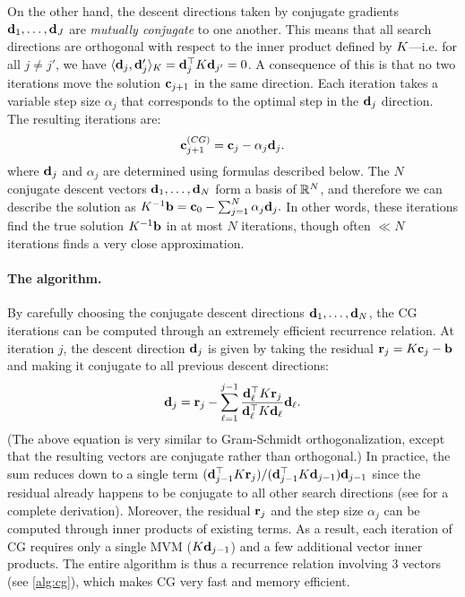 On the other hand, the descent directions taken by conjugate gradients $\mathbf{d}_1, \ldots, \mathbf{d}_J$ are \emph{mutually conjugate} to one another.
This means that all search directions are orthogonal with respect to the inner product defined by $K$---i.e. for all $j \ne j'$, we have $\langle \mathbf{d}_j, \mathbf{d}_j' \rangle_{K} = \mathbf{d}_j^\top K \mathbf{d}_{j'} = 0$.
A consequence of this is that no two iterations move the solution $\mathbf{c}_{j+1}$ in the same direction.
Each iteration takes a variable step size $\alpha_j$ that corresponds to the optimal step in the $\mathbf{d}_j$ direction.
The resulting iterations are:
%
\begin{equation*}
  \mathbf{c}_{j+1}^{\text(CG)} = \mathbf{c}_{j} - \alpha_j \mathbf{d}_{j}.
\end{equation*}
%
where $\mathbf{d}_j$ and $\alpha_j$ are determined using formulas described below.
The $N$ conjugate descent vectors $\mathbf{d}_1, \ldots, \mathbf{d}_N$ form a basis of $\mathbb{R}^N$, and therefore we can describe the solution as $K^{-1} \mathbf{b} = \mathbf{c}_0 - \sum_{j=1}^N \alpha_j \mathbf{d}_j.$
In other words, these iterations find the true solution $K^{-1} \mathbf{b}$ in at most $N$ iterations, though often $\ll N$ iterations finds a very close approximation.

\paragraph{The algorithm.}
By carefully choosing the conjugate descent directions $\mathbf{d}_1, \ldots, \mathbf{d}_N$, the CG iterations can be computed through an extremely efficient recurrence relation.
At iteration $j$, the descent direction $\mathbf{d}_j$ is given by taking the residual $\mathbf{r}_j = K \mathbf{c}_{j} - \mathbf{b}$ and making it conjugate to all previous descent directions:
%
\begin{equation*}
  \mathbf{d}_j = \mathbf{r}_j - \sum_{\ell = 1}^{j-1} \frac{ \mathbf{d}_\ell^\top K \mathbf{r}_j }{ \mathbf{d}_\ell^\top K \mathbf{d}_\ell } \mathbf{d}_\ell.
\end{equation*}
%
(The above equation is very similar to Gram-Schmidt orthogonalization, except that the resulting vectors are conjugate rather than orthogonal.)
In practice, the sum reduces down to a single term $( \mathbf{d}_{j-1}^\top K \mathbf{r}_j ) / ( \mathbf{d}_{j-1}^\top K \mathbf{d}_{j-1} ) \mathbf{d}_{j-1}$ since the residual already happens to be conjugate to all other search directions (see \citep[Sec. 7-8]{shewchuk1994introduction} for a complete derivation).
Moreover, the residual $\mathbf{r}_j$ and the step size $\alpha_j$ can be computed through inner products of existing terms.
As a result, each iteration of CG requires only a single MVM ($K \mathbf{d}_{j-1}$) and a few additional vector inner products.
The entire algorithm is thus a recurrence relation involving 3 vectors (see \cref{alg:cg}), which makes CG very fast and memory efficient.

